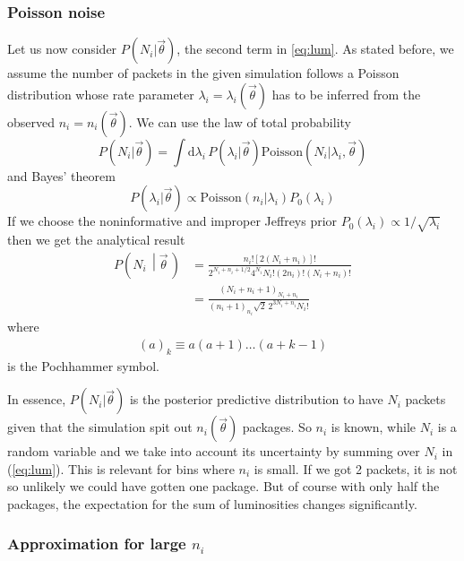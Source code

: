 \documentclass[a4,12pt]{article}
\newcommand{\given}[2]{\left(#1\, \middle| #2 \, \right)}
\newcommand{\poisson}{\ensuremath{\mathrm{Poisson}}}
\newcommand{\rmdx}[1]{\mbox{d} #1 \,} %
\newcommand{\vecth}{\ensuremath{{\vec{\theta}}}}
\def \refeq#1{(\ref{eq:#1})}
\begin{document}
\subsubsection{Poisson noise}

Let us now consider $P(N_i | \vecth)$, the second term in
\eqref{eq:lum}. As stated before, we assume the number of packets in
the given simulation follows a Poisson distribution whose rate
parameter $\lambda_i = \lambda_i(\vecth)$ has to be inferred from the
observed $n_i = n_i(\vecth)$. We can use the law of total probability
\begin{equation}
  \label{eq:poisson-post-pred}
  P(N_i | \vecth) = \int \rmdx{\lambda_i} P(\lambda_i | \vecth) \poisson(N_i | \lambda_i, \vecth)
\end{equation}
and Bayes' theorem
\begin{equation}
  \label{eq:poisson-post}
  P(\lambda_i | \vecth) \propto \poisson(n_i | \lambda_i) P_0(\lambda_i)
\end{equation}
If we choose the noninformative and improper Jeffreys prior
$P_0(\lambda_i) \propto 1/\sqrt{\lambda_i}$ then we get the analytical
result~\cite[Eq. 5]{Aggarwal:2011aa}
\begin{align}
  \label{eq:post-pred-analytical}
  P\given{N_i}{\vecth} &= \frac{n_i! [2 (N_i + n_i)]!}{2^{N_i+n_i+1/2}4^{N_i} N_i! (2 n_i)! (N_i + n_i)!}\\
  &= \frac{(N_i + n_i + 1)_{N_i + n_i}}{(n_i + 1)_{n_i} \sqrt{2}\, 2^{3N_i + n_i}N_i!}
\end{align}
where
\begin{align}
  \label{eq:pochhammer}
  (a)_k \equiv a (a + 1) \dots (a + k - 1)
\end{align}
is the Pochhammer symbol.

In essence, $P(N_i | \vecth)$ is
the posterior predictive distribution to have $N_i$ packets given that
the simulation spit out $n_i(\vecth)$ packages. So $n_i$ is known,
while $N_i$ is a random variable and we take into account its
uncertainty by summing over $N_i$ in \refeq{lum}. This is relevant for bins where $n_i$ is small. If we got
2 packets, it is not so unlikely we could have gotten one package. But
of course with only half the packages, the expectation for the sum of
luminosities changes significantly.

\subsubsection*{Approximation for large $n_i$}
\end{document}
